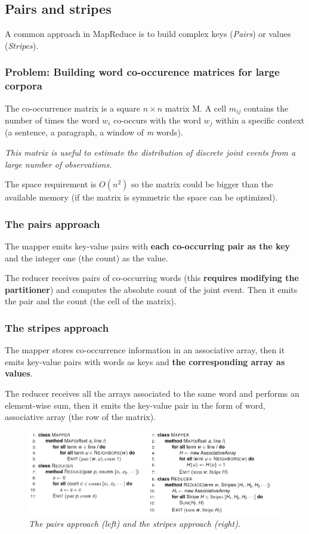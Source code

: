 \subsection{Pairs and stripes}
A common approach in MapReduce is to build complex keys (\textit{Pairs}) or values (\textit{Stripes}).
\subsubsection{Problem: Building word co-occurence matrices for large corpora}
The co-occurrence matrix is a square $n\times n$ matrix M. A cell $m _{ij}$ contains the number of times the word $w_i$ co-occurs with the word $w_j$ within a specific context (a sentence, a paragraph, a window of \textit{m} words).
\par\noindent
\textit{This matrix is useful to estimate the distribution of discrete joint events from a large number of observations.}
\par\noindent
The space requirement is $O(n^2)$ so the matrix could be bigger than the available memory (if the matrix is symmetric the space can be optimized).
\subsubsection{The pairs approach}
The mapper emits key-value pairs with \textbf{each co-occurring pair as the key} and the integer one (the count) as the value.
\par\noindent
The reducer receives pairs of co-occurring words (this \textbf{requires modifying the partitioner}) and computes the absolute count of the joint event. Then it emits the pair and the count (the cell of the matrix).
\subsubsection{The stripes approach}
The mapper stores co-occurrence information in an associative array, then it emits key-value pairs with words as keys and \textbf{the corresponding array as values}.
\par\noindent
The reducer receives all the arrays associated to the same word and performs an element-wise sum, then it emits the key-value pair in the form of word, associative array (the row of the matrix).
\begin{figure}[h!]
	\includegraphics[width=\linewidth]{images/pairsandstripes.png}
	\caption{\textit{The pairs approach (left) and the stripes approach (right).}}
\end{figure}
